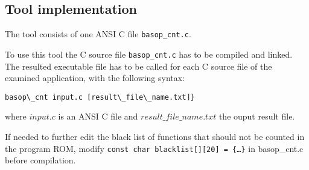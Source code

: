 \subsection{Tool implementation}
The tool consists of one ANSI C file {\tt basop\_cnt.c}.

To use this tool the C source file {\tt basop\_cnt.c} has to be
compiled and linked. The resulted executable file has to be called for
each C source file of the examined application, with the following
syntax:
\begin{verbatim}
basop\_cnt input.c [result\_file\_name.txt]}
\end{verbatim}
where $input.c$ is an ANSI C file and $result\_file\_name.txt$ the
ouput result file.

If needed to further edit the black list of functions that should not
be counted in the program ROM, modify {\tt const char blacklist[][20]
= \{{\dots}\}} in basop\_cnt.c before compilation.


